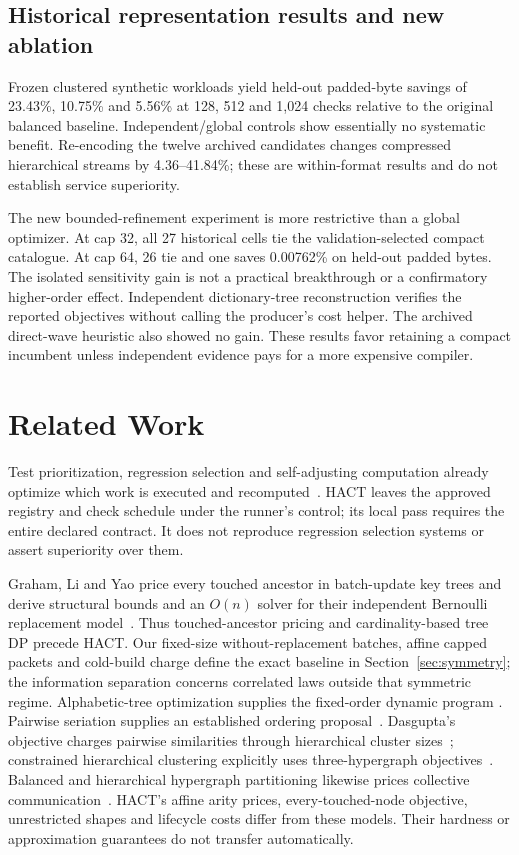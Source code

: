\documentclass[preprint,12pt]{elsarticle}
\theoremstyle{definition}\newtheorem{definition}[theorem]{Definition}
\begin{document}
\subsection{Historical representation results and new ablation}
Frozen clustered synthetic workloads yield held-out padded-byte savings of
23.43\%, 10.75\% and 5.56\% at 128, 512 and 1,024 checks relative to the
original balanced baseline. Independent/global controls show essentially
no systematic benefit. Re-encoding the twelve archived candidates changes
compressed hierarchical streams by 4.36--41.84\%; these are within-format
results and do not establish service superiority.

The new bounded-refinement experiment is more restrictive than a global
optimizer. At cap 32, all 27 historical cells tie the validation-selected
compact catalogue. At cap 64, 26 tie and one saves 0.00762\% on held-out
padded bytes. The isolated sensitivity gain is not a practical breakthrough
or a confirmatory higher-order effect. Independent dictionary-tree
reconstruction verifies the reported objectives without calling the
producer's cost helper. The archived direct-wave heuristic also showed
no gain. These results favor retaining a compact incumbent unless
independent evidence pays for a more expensive compiler.





\section{Related Work}\label{sec:jrelated}
Test prioritization, regression selection and self-adjusting computation
already optimize which work is executed and recomputed~\cite{rothermel,ekstazi,acar,build}.
HACT leaves the approved registry and check schedule under the runner's control; its local pass
requires the entire declared contract. It does not reproduce regression
selection systems or assert superiority over them.

Graham, Li and Yao price every touched ancestor in batch-update key trees
and derive structural bounds and an $O(n)$ solver for their independent
Bernoulli replacement model~\cite{graham2007}. Thus touched-ancestor
pricing and cardinality-based tree DP precede HACT. Our fixed-size
without-replacement batches, affine capped packets and cold-build charge
define the exact baseline in Section~\ref{sec:symmetry}; the information
separation concerns correlated laws outside that symmetric regime.
Alphabetic-tree optimization supplies the fixed-order dynamic program
\cite{alphabetic}. Pairwise seriation supplies an established ordering
proposal~\cite{atkins}. Dasgupta's objective charges pairwise similarities
through hierarchical cluster sizes~\cite{dasgupta}; constrained hierarchical
clustering explicitly uses three-hypergraph objectives~\cite{hyperhierarchy}.
Balanced and hierarchical hypergraph partitioning likewise prices collective
communication~\cite{hyperpartition}. HACT's affine arity prices, every-touched-node
objective, unrestricted shapes and lifecycle costs differ from these models.
Their hardness or approximation guarantees do not transfer automatically.
\end{document}
